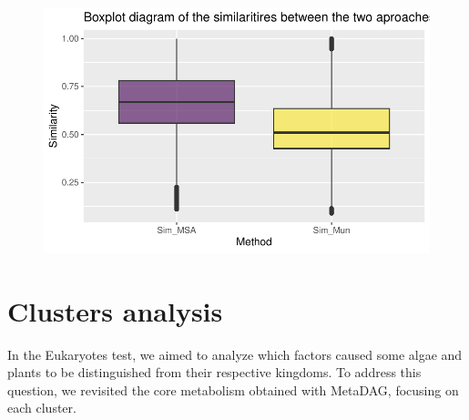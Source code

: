 \documentclass[
  letterpaper,
  DIV=11,
  numbers=noendperiod]{scrreprt}
\begin{document}
\begin{figure}[H]

{\centering \includegraphics[width=1\textwidth,height=\textheight]{index_files/figure-pdf/unnamed-chunk-54-1.pdf}

}

\end{figure}


\hypertarget{clusters-analysis}{%
\chapter{Clusters analysis}\label{clusters-analysis}}

In the Eukaryotes test, we aimed to analyze which factors caused some
algae and plants to be distinguished from their respective kingdoms. To
address this question, we revisited the core metabolism obtained with
MetaDAG, focusing on each cluster.
\end{document}
